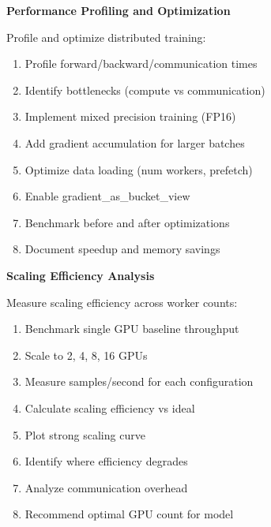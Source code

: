 \begin{exercise}
\textbf{Performance Profiling and Optimization}

Profile and optimize distributed training:

\begin{enumerate}
    \item Profile forward/backward/communication times
    \item Identify bottlenecks (compute vs communication)
    \item Implement mixed precision training (FP16)
    \item Add gradient accumulation for larger batches
    \item Optimize data loading (num workers, prefetch)
    \item Enable gradient\_as\_bucket\_view
    \item Benchmark before and after optimizations
    \item Document speedup and memory savings
\end{enumerate}
\end{exercise}

\begin{exercise}
\textbf{Scaling Efficiency Analysis}

Measure scaling efficiency across worker counts:

\begin{enumerate}
    \item Benchmark single GPU baseline throughput
    \item Scale to 2, 4, 8, 16 GPUs
    \item Measure samples/second for each configuration
    \item Calculate scaling efficiency vs ideal
    \item Plot strong scaling curve
    \item Identify where efficiency degrades
    \item Analyze communication overhead
    \item Recommend optimal GPU count for model
\end{enumerate}
\end{exercise}


